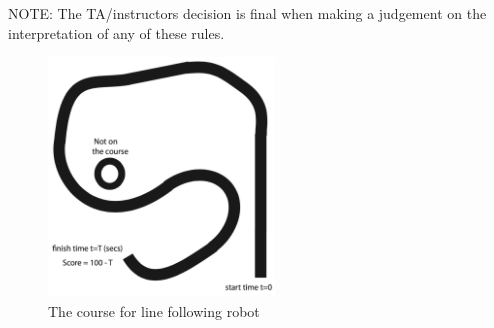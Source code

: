 \documentclass[11pt]{article}
\begin{document}
\begin{enumerate}
\end{enumerate}
NOTE: The TA/instructors decision is final when making a judgement on the interpretation of any of these rules. 

 
 \begin{figure}[t]
\begin{center}
 \includegraphics[angle=0, height=2.5in]{figures/line_following.png}
\end{center}
 \caption{The course for line following robot}
   \label{fig:lab4-course}
\end{figure}
\end{document}
